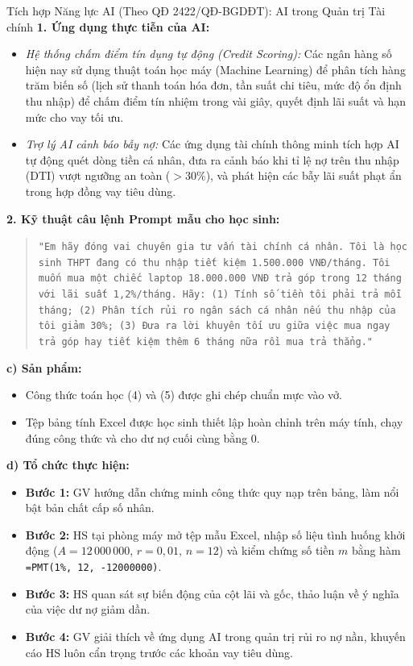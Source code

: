 \documentclass[12pt, a4paper]{article}
\begin{document}
\begin{aibox}{Tích hợp Năng lực AI (Theo QĐ 2422/QĐ-BGDĐT): AI trong Quản trị Tài chính}
    \textbf{1. Ứng dụng thực tiễn của AI:}
    \begin{itemize}
        \item \textit{Hệ thống chấm điểm tín dụng tự động (Credit Scoring):} Các ngân hàng số hiện nay sử dụng thuật toán học máy (Machine Learning) để phân tích hàng trăm biến số (lịch sử thanh toán hóa đơn, tần suất chi tiêu, mức độ ổn định thu nhập) để chấm điểm tín nhiệm trong vài giây, quyết định lãi suất và hạn mức cho vay tối ưu.
        \item \textit{Trợ lý AI cảnh báo bẫy nợ:} Các ứng dụng tài chính thông minh tích hợp AI tự động quét dòng tiền cá nhân, đưa ra cảnh báo khi tỉ lệ nợ trên thu nhập (DTI) vượt ngưỡng an toàn ($>30\%$), và phát hiện các bẫy lãi suất phạt ẩn trong hợp đồng vay tiêu dùng.
    \end{itemize}
    \textbf{2. Kỹ thuật câu lệnh Prompt mẫu cho học sinh:}
    \begin{quote}
        \small \texttt{"Em hãy đóng vai chuyên gia tư vấn tài chính cá nhân. Tôi là học sinh THPT đang có thu nhập tiết kiệm 1.500.000 VNĐ/tháng. Tôi muốn mua một chiếc laptop 18.000.000 VNĐ trả góp trong 12 tháng với lãi suất 1,2\%/tháng. Hãy: (1) Tính số tiền tôi phải trả mỗi tháng; (2) Phân tích rủi ro ngân sách cá nhân nếu thu nhập của tôi giảm 30\%; (3) Đưa ra lời khuyên tối ưu giữa việc mua ngay trả góp hay tiết kiệm thêm 6 tháng nữa rồi mua trả thẳng."}
    \end{quote}
\end{aibox}

\noindent \textbf{c) Sản phẩm:}
\begin{itemize}
    \item Công thức toán học (4) và (5) được ghi chép chuẩn mực vào vở.
    \item Tệp bảng tính Excel được học sinh thiết lập hoàn chỉnh trên máy tính, chạy đúng công thức và cho dư nợ cuối cùng bằng 0.
\end{itemize}

\noindent \textbf{d) Tổ chức thực hiện:}
\begin{itemize}
    \item \textbf{Bước 1:} GV hướng dẫn chứng minh công thức quy nạp trên bảng, làm nổi bật bản chất cấp số nhân.
    \item \textbf{Bước 2:} HS tại phòng máy mở tệp mẫu Excel, nhập số liệu tình huống khởi động ($A = 12\,000\,000$, $r = 0{,}01$, $n = 12$) và kiểm chứng số tiền $m$ bằng hàm \texttt{=PMT(1\%, 12, -12000000)}.
    \item \textbf{Bước 3:} HS quan sát sự biến động của cột lãi và gốc, thảo luận về ý nghĩa của việc dư nợ giảm dần.
    \item \textbf{Bước 4:} GV giải thích về ứng dụng AI trong quản trị rủi ro nợ nần, khuyến cáo HS luôn cẩn trọng trước các khoản vay tiêu dùng.
\end{itemize}
\end{document}
